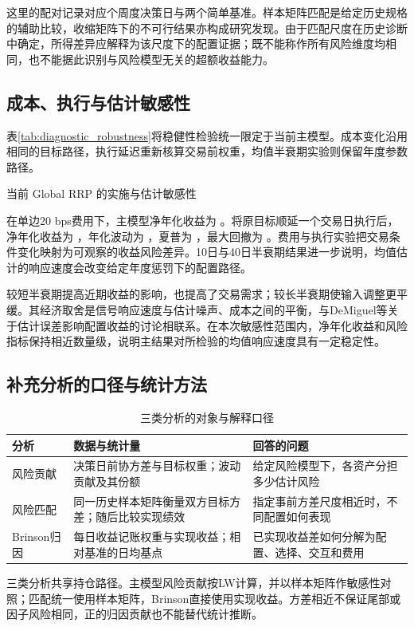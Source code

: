这里的配对记录对应\primaryRebalances{}个周度决策日与两个简单基准。样本矩阵匹配是给定历史规格的辅助比较，收缩矩阵下的不可行结果亦构成研究发现。由于匹配尺度在历史诊断中确定，所得差异应解释为该尺度下的配置证据；既不能称作所有风险维度均相同，也不能据此识别与风险模型无关的超额收益能力。

\subsection{成本、执行与估计敏感性}
表\ref{tab:diagnostic_robustness}将稳健性检验统一限定于当前主模型。成本变化沿用相同的目标路径，执行延迟重新核算交易前权重，均值半衰期实验则保留年度参数路径。

\begin{table}[htbp]\centering
\caption{当前 Global RRP 的实施与估计敏感性}\label{tab:diagnostic_robustness}
\fitthesistable{}
\end{table}

在单边20 bps费用下，主模型净年化收益为 \diagCostTwentyReturn。将原目标顺延一个交易日执行后，净年化收益为 \diagDelayReturn，年化波动为 \diagDelayVol，夏普为 \diagDelaySharpe，最大回撤为 \diagDelayDD。费用与执行实验把交易条件变化映射为可观察的收益风险差异。10日与40日半衰期结果进一步说明，均值估计的响应速度会改变给定年度惩罚下的配置路径。

较短半衰期提高近期收益的影响，也提高了交易需求；较长半衰期使输入调整更平缓。其经济取舍是信号响应速度与估计噪声、成本之间的平衡，与DeMiguel等关于估计误差影响配置收益的讨论相联系\cite{demiguel2009optimal}。在本次敏感性范围内，净年化收益和风险指标保持相近数量级，说明主结果对所检验的均值响应速度具有一定稳定性。

\subsection{补充分析的口径与统计方法}
\begin{table}[htbp]\centering
\caption{三类分析的对象与解释口径}\label{tab:analysis_scope}
\begin{tabularx}{\textwidth}{@{}l L L@{}}\toprule
分析 & 数据与统计量 & 回答的问题\\\midrule
风险贡献 & 决策日前协方差与目标权重；波动贡献及其份额 & 给定风险模型下，各资产分担多少估计风险\\
风险匹配 & 同一历史样本矩阵衡量双方目标方差；随后比较实现绩效 & 指定事前方差尺度相近时，不同配置如何表现\\
Brinson归因 & 每日收益记账权重与实现收益；相对基准的日均基点 & 已实现收益差如何分解为配置、选择、交互和费用\\\bottomrule
\end{tabularx}
\end{table}
三类分析共享持仓路径。主模型风险贡献按LW计算，并以样本矩阵作敏感性对照；匹配统一使用样本矩阵，Brinson直接使用实现收益。方差相近不保证尾部或因子风险相同，正的归因贡献也不能替代统计推断。


